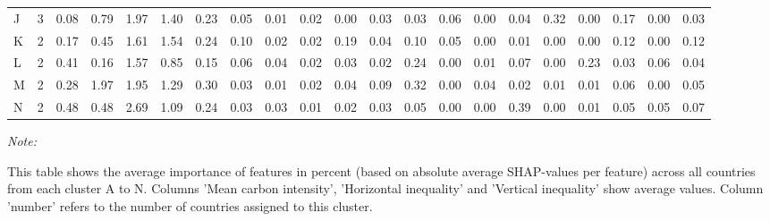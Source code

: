 \begin{table}[H]
{\begin{threeparttable}
\begin{tabular}[t]{lrrrrrrrrrrrrrrrrrrrr}
J & 3 & 0.08 & 0.79 & 1.97 & 1.40 & 0.23 & 0.05 & 0.01 & 0.02 & 0.00 & 0.03 & 0.03 & 0.06 & 0.00 & 0.04 & 0.32 & 0.00 & 0.17 & 0.00 & 0.03\\
K & 2 & 0.17 & 0.45 & 1.61 & 1.54 & 0.24 & 0.10 & 0.02 & 0.02 & 0.19 & 0.04 & 0.10 & 0.05 & 0.00 & 0.01 & 0.00 & 0.00 & 0.12 & 0.00 & 0.12\\
L & 2 & 0.41 & 0.16 & 1.57 & 0.85 & 0.15 & 0.06 & 0.04 & 0.02 & 0.03 & 0.02 & 0.24 & 0.00 & 0.01 & 0.07 & 0.00 & 0.23 & 0.03 & 0.06 & 0.04\\
M & 2 & 0.28 & 1.97 & 1.95 & 1.29 & 0.30 & 0.03 & 0.01 & 0.02 & 0.04 & 0.09 & 0.32 & 0.00 & 0.04 & 0.02 & 0.01 & 0.01 & 0.06 & 0.00 & 0.05\\
N & 2 & 0.48 & 0.48 & 2.69 & 1.09 & 0.24 & 0.03 & 0.03 & 0.01 & 0.02 & 0.03 & 0.05 & 0.00 & 0.00 & 0.39 & 0.00 & 0.01 & 0.05 & 0.05 & 0.07\\
\bottomrule
\end{tabular}
\begin{tablenotes}
\item \textit{Note: } 
\item This table shows the average importance of features in percent (based on absolute average SHAP-values per feature) across all countries from each cluster A to N. Columns 'Mean carbon intensity', 'Horizontal inequality' and 'Vertical inequality' show average values. Column 'number' refers to the number of countries assigned to this cluster.
\end{tablenotes}
\end{threeparttable}}
\end{table}
